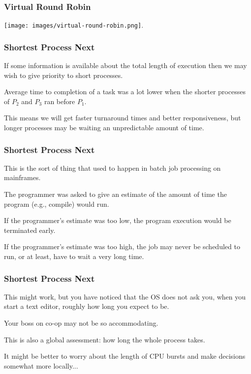\begin{frame}
\frametitle{Virtual Round Robin}

\begin{center}
	\texttt{[image: images/virtual-round-robin.png]}.
\end{center}


\end{frame}

\begin{frame}
\frametitle{Shortest Process Next}

If some information is available about the total length of execution then we may wish to give priority to short processes. 


Average time to completion of a task was a lot lower when the shorter processes of $P_{2}$ and $P_{3}$ ran before $P_{1}$. 

This means we will get faster turnaround times and better responsiveness, but longer processes may be waiting an unpredictable amount of time.

\end{frame}

\begin{frame}
\frametitle{Shortest Process Next}

This is the sort of thing that used to happen in batch job processing on mainframes. 

The programmer was asked to give an estimate of the amount of time the program (e.g., compile) would run. 

If the programmer's estimate was too low, the program execution would be terminated early. 

If the programmer's estimate was too high, the job may never be scheduled to run, or at least, have to wait a very long time. 


\end{frame}

\begin{frame}
\frametitle{Shortest Process Next}


This might work, but you have noticed that the OS does not ask you, when you start a text editor, roughly how long you expect to be. 

Your boss on co-op may not be so accommodating. 

This is also a global assessment: how long the whole process takes. 

It might be better to worry about the length of CPU bursts and make decisions somewhat more locally...


\end{frame}

